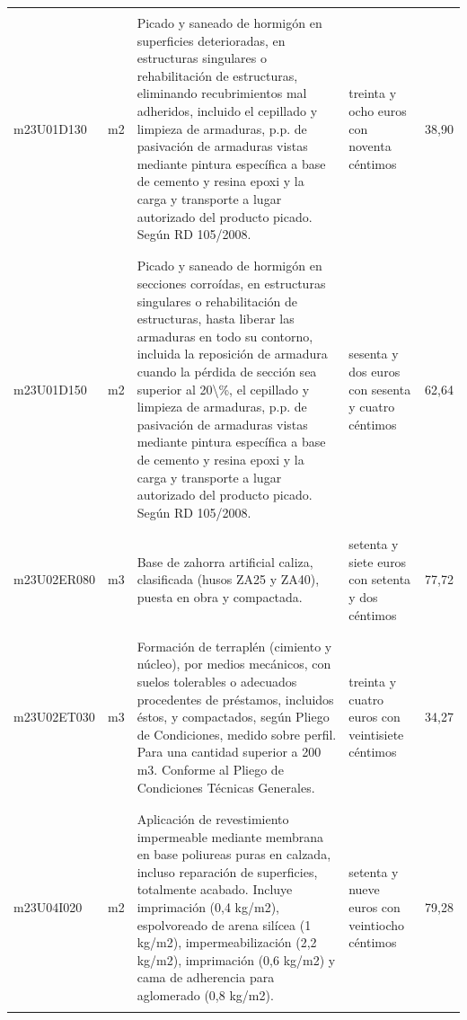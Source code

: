 \documentclass{book}%
\begin{document}
\begin{supertabular}{|l|l|p{5cm}|p{3cm}|r|}
&&&&\\%
m23U01D130&m2&Picado y saneado de hormigón en superficies deterioradas, en estructuras singulares o rehabilitación de estructuras, eliminando recubrimientos mal adheridos, incluido el cepillado y limpieza de armaduras, p.p. de pasivación de armaduras vistas mediante pintura específica a base de cemento y resina epoxi y la carga y transporte a lugar autorizado del producto picado. Según RD 105/2008.&treinta y ocho euros con noventa céntimos&38,90\\%
&&&&\\%
&&&&\\%
m23U01D150&m2&Picado y saneado de hormigón en secciones corroídas, en estructuras singulares o rehabilitación de estructuras, hasta liberar las armaduras en todo su contorno, incluida la reposición de armadura cuando la pérdida de sección sea superior al 20\textbackslash{}\%, el cepillado y limpieza de armaduras, p.p. de pasivación de armaduras vistas mediante pintura específica a base de cemento y resina epoxi y la carga y transporte a lugar autorizado del producto picado. Según RD 105/2008.&sesenta y dos euros con sesenta y cuatro céntimos&62,64\\%
&&&&\\%
&&&&\\%
m23U02ER080&m3&Base de zahorra artificial caliza, clasificada (husos ZA25 y ZA40), puesta en obra y compactada.&setenta y siete euros con setenta y dos céntimos&77,72\\%
&&&&\\%
&&&&\\%
m23U02ET030&m3&Formación de terraplén (cimiento y núcleo), por medios mecánicos, con suelos tolerables o adecuados procedentes de préstamos, incluidos éstos, y compactados, según Pliego de Condiciones, medido sobre perfil. Para una cantidad superior a 200 m3. Conforme al Pliego de Condiciones Técnicas Generales.&treinta y cuatro euros con veintisiete céntimos&34,27\\%
&&&&\\%
&&&&\\%
m23U04I020&m2&Aplicación de revestimiento impermeable mediante membrana en base poliureas puras en calzada, incluso reparación de superficies, totalmente acabado. Incluye imprimación (0,4 kg/m2), espolvoreado de arena silícea (1 kg/m2), impermeabilización (2,2 kg/m2), imprimación (0,6 kg/m2) y cama de adherencia para aglomerado (0,8 kg/m2).&setenta y nueve euros con veintiocho céntimos&79,28\\%
&&&&\\%

\end{supertabular}
\end{document}
